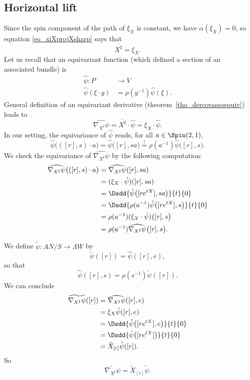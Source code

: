 \subsection{Horizontal lift}

Since the spin component of the path of $\xi_{X}$ is constant, we have $\alpha(\xi_{X})=0$, so equation  \eqref{eq_xiXprojXsharp} says that
\begin{equation}
\overline{ X^{\sharp} }=\xi_{X}.
\end{equation}
Let us recall that an equivariant function (which defined a section of an associated bundle) is
\begin{equation}
\begin{aligned}
 \hat{\psi}\colon P&\to V \\
\hat{\psi}(\xi\cdot g)&= \rho(g^{-1})\hat{\psi}(\xi).
\end{aligned}
\end{equation}
General definition of an equivariant derivative (theorem~\ref{tho_dercovassoequiv}) leads to
\[
  \widehat{    \nabla_{X^{\sharp}}\psi    }=\overline{ X^{\sharp} }\cdot\hat{\psi}=\xi_{X} \cdot \hat{\psi}.
\]
In our setting, the equivariance of $\hat{\psi}$ reads, for all $a\in\Spin(2,1)$,
\[
  \hat{\psi}\big( ([r],s)\cdot a \big)=\hat{\psi}\big( [r],sa \big)\stackrel{!}{=}\rho(a^{-1})\hat{\psi}\big( [r],s \big).
\]
We check the equivariance of $\widehat{\nabla_{X^{\sharp}}\psi}$ by the following computation:
\[
\begin{split}
\widehat{\nabla_{X^{\sharp}}\psi  }\big( ([r],s)\cdot a \big)&=\widehat{\nabla_{X^{\sharp}}\psi}( [r],sa )\\
        &=(\xi_{X}\cdot \hat{\psi})([r],sa)\\
        &=\Dsdd{ \hat{\psi}\big( [r e^{tX}],sa \big) }{t}{0}\\
        &=\Dsdd{ \rho(a^{-1})\hat{\psi}\big( [r e^{tX}],s \big) }{t}{0}\\
        &=\rho(a^{-1})(\xi_{X}\cdot \hat{\psi})\big( [r],s \big)\\
        &=\rho(a^{-1})\widehat{  \nabla_{X^{\sharp}}\psi  }\big( [r],s \big).
\end{split}
\]

We define $\tilde{\psi}\colon AN/S\to \Lambda W$ by
\[
  \tilde{\psi}([r])=\hat{\psi}( [r],e ),
\]
so that
\begin{equation}
\hat{\psi}([r],s)=\rho(s^{-1})\tilde{\psi}([r]).
\end{equation}
We can conclude
\[
\begin{split}
\widetilde{ \nabla_{X^{\sharp}}\psi  }([r])&=\widehat{\nabla_{X^{\sharp}}\psi}([r],e)\\
        &=\xi_{X}\hat{\psi}([r],e)\\
        &=\Dsdd{ \hat{\psi}\big( [r e^{tX}],e \big) }{t}{0}\\
        &=\Dsdd{ \tilde{\psi}\big( [r e^{tX}] \big) }{t}{0}\\
        &=\tilde X_{[r]}\tilde{\psi}([r]).
\end{split}
\]
So
\begin{equation}
\widetilde{\nabla_{X^{\sharp}}\psi}=\tilde X_{[r]}\tilde{\psi}.
\end{equation}

